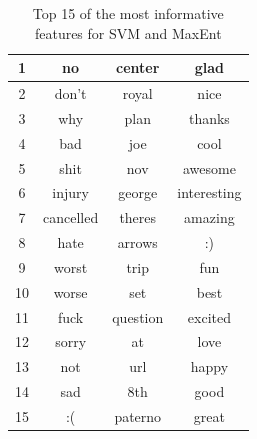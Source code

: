 \begin{table}[!htb]
\begin{minipage}{.45\linewidth}
\begin{tabular}{|c|c|c|c|}
		1 & no 	& center & glad \\ \hline
		2 & don't 	& royal & nice \\ \hline
		3 & why 	& plan & thanks \\ \hline
		4 & bad 	& joe & cool \\ \hline
		5 & shit 	& nov & awesome \\ \hline
		6 & injury 	& george & interesting \\ \hline
		7 & cancelled 	& theres & amazing \\ \hline
		8 & hate 	& arrows & :) \\ \hline
		9 & worst 	& trip & fun \\ \hline
		10 & worse 	& set & best \\ \hline
		11 & fuck 	& question & excited \\ \hline
		12 & sorry 	& at & love \\ \hline
		13 & not 	& url & happy \\ \hline
		14 & sad 	& 8th & good \\ \hline
		15 & :( 	& paterno & great \\ \hline
		\end{tabular}
	\end{minipage}
	\caption[Most informative features]{Top 15 of the most informative features for SVM and MaxEnt}
	\label{tab:informative_features}
\end{table}

